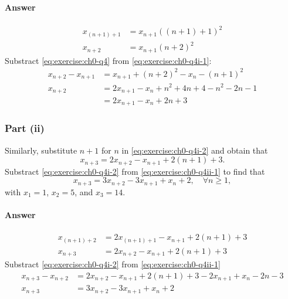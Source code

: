 \paragraph{Answer}
\begin{align*}
    x_{(n + 1) + 1} &= x_{n + 1} ((n + 1) + 1)^2 \\
    x_{n + 2} &= x_{n + 1} (n + 2)^2
\end{align*}
Substract \eqref{eq:exercise:ch0-q4} from \eqref{eq:exercise:ch0-q4i-1}:
\begin{align*}
    x_{n + 2} - x_{n + 1} &= x_{n + 1} + (n + 2)^2 - x_n - (n + 1)^2 \\
    x_{n + 2} &= 2 x_{n + 1} - x_n + n^2 + 4 n + 4 - n^2 - 2 n - 1 \\
              &= 2 x_{n + 1} - x_n + 2 n + 3
\end{align*}

\subsubsection{Part (ii)}
Similarly, substitute $ n + 1 $ for $ n $ in \eqref{eq:exercise:ch0-q4i-2} and obtain that
\begin{equation}
    x_{n + 3} = 2 x_{n + 2} - x_{n + 1} + 2(n + 1) + 3.
    \label{eq:exercise:ch0-q4ii-1}
\end{equation}
Substract \eqref{eq:exercise:ch0-q4i-2} from \eqref{eq:exercise:ch0-q4ii-1} to find that
\begin{equation}
    x_{n + 3} = 3 x_{n + 2} - 3 x_{n + 1} + x_n + 2, \quad \forall n \geq 1,
    \label{eq:exercise:ch0-q4ii-2}
\end{equation}
with $ x_1 = 1 $, $ x_2 = 5 $, and $ x_3 = 14 $.

\paragraph{Answer}
\begin{align*}
    x_{(n + 1) + 2} &= 2 x_{(n + 1) + 1} - x_{n + 1} + 2(n + 1) + 3 \\
    x_{n + 3} &= 2 x_{n + 2} - x_{n + 1} + 2(n + 1) + 3
\end{align*}
Substract \eqref{eq:exercise:ch0-q4i-2} from \eqref{eq:exercise:ch0-q4ii-1}
\begin{align*}
    x_{n + 3} - x_{n + 2} &= 2 x_{n + 2} - x_{n + 1} + 2(n + 1) + 3 - 2 x_{n + 1} + x_n - 2 n - 3 \\
    x_{n + 3} &= 3 x_{n + 2} -3 x_{n + 1} + x_n + 2
\end{align*}


